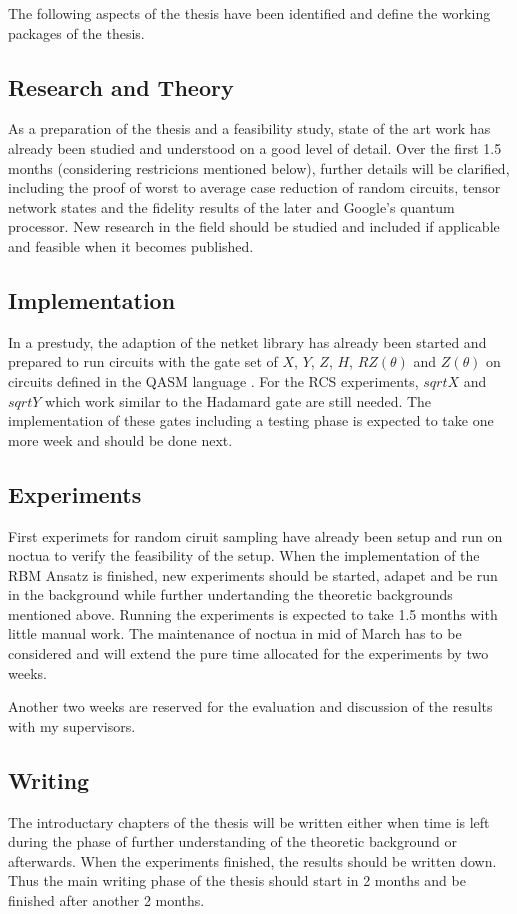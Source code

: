 The following aspects of the thesis have been identified and define the working packages of the thesis.

\subsection{Research and Theory}
As a preparation of the thesis and a feasibility study, state of the art work has already been studied 
and understood on a good level of detail. Over the first 1.5 months (considering restricions mentioned below), further details will be clarified, including 
the proof of worst to average case reduction of random circuits, tensor network states and the fidelity results 
of the later and Google's quantum processor. New research in the field should be studied and included if applicable and feasible when it becomes published.

\subsection{Implementation}
In a prestudy, the adaption of the netket library has already been started and prepared to run circuits with 
the gate set of $X$, $Y$, $Z$, $H$, $RZ(\theta)$ and $Z(\theta)$ on circuits defined in the QASM language \cite{cross2017open}. For the RCS experiments, $sqrtX$ and $sqrtY$ which work similar to the Hadamard gate are still 
needed. The implementation of these gates including a testing phase is expected to take one more week and should
be done next.

\subsection{Experiments}
First experimets for random ciruit sampling have already been setup and run on noctua to verify the feasibility of
the setup. When the implementation of the RBM Ansatz is finished, new experiments should be started, adapet and be run in the 
background while further undertanding the theoretic backgrounds mentioned above. Running the experiments is expected 
to take 1.5 months with little manual work. The maintenance of noctua in mid of March has to be considered
and will extend the pure time allocated for the experiments by two weeks.

Another two weeks are reserved for the evaluation and discussion of the results with my supervisors.

\subsection{Writing}
The introductary chapters of the thesis will be written either when time is left during the phase of further 
understanding of the theoretic background or afterwards. When the experiments finished, the results should be written
down. Thus the main writing phase of the thesis should start in 2 months and be finished after another 2 months.

